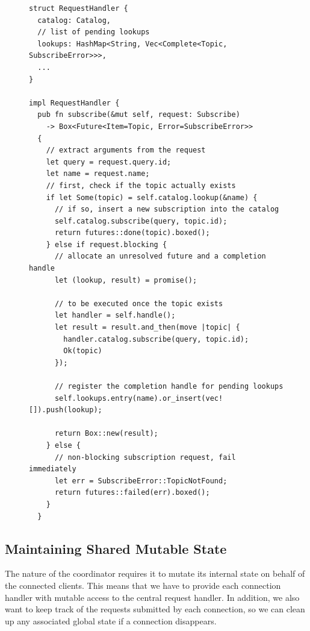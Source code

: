 \begin{figure}[p]
\begin{lstlisting}[caption={[Handler for blocking subscription requests]
Example how a future is created for the subscription request. Depending
on whether it can be served immediately or not, different kinds of futures
are returned. Bookkeeping for still pending requests is done with completion
handles. Upon publication of a requested topic, any pending subscriptions will
be completed by calling \lstinline{lookup.complete()}.},label={lst:fnsubscribe}]
struct RequestHandler {
  catalog: Catalog,
  // list of pending lookups
  lookups: HashMap<String, Vec<Complete<Topic, SubscribeError>>>,
  ...
}

impl RequestHandler {
  pub fn subscribe(&mut self, request: Subscribe)
    -> Box<Future<Item=Topic, Error=SubscribeError>>
  {
    // extract arguments from the request
    let query = request.query.id;
    let name = request.name;
    // first, check if the topic actually exists
    if let Some(topic) = self.catalog.lookup(&name) {
      // if so, insert a new subscription into the catalog
      self.catalog.subscribe(query, topic.id);
      return futures::done(topic).boxed();
    } else if request.blocking {
      // allocate an unresolved future and a completion handle
      let (lookup, result) = promise();

      // to be executed once the topic exists
      let handler = self.handle();
      let result = result.and_then(move |topic| {
        handler.catalog.subscribe(query, topic.id);
        Ok(topic)
      });

      // register the completion handle for pending lookups
      self.lookups.entry(name).or_insert(vec![]).push(lookup);

      return Box::new(result);
    } else {
      // non-blocking subscription request, fail immediately
      let err = SubscribeError::TopicNotFound;
      return futures::failed(err).boxed();
    }
  }
\end{lstlisting}
\end{figure}

\subsection{Maintaining Shared Mutable State}

The nature of the coordinator requires it to mutate its internal state on
behalf of the connected clients. This means that we have to provide each
connection handler with mutable access to the central request handler. 
In addition, we also want to keep track of the requests submitted by
each connection, so we can clean up any associated global state if a connection
disappears.

